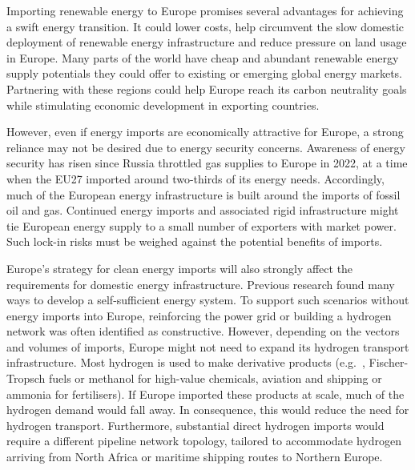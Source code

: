 
Importing renewable energy to Europe promises several advantages for achieving a
swift energy transition. It could lower costs, help circumvent the slow domestic
deployment of renewable energy infrastructure and reduce pressure on land usage
in Europe. Many parts of the world have cheap and abundant renewable energy
supply potentials they could offer to existing or emerging global energy
markets.\cite{irenaGlobalHydrogen2022,luxSupplyCurves2021,vanderzwaanTimmermansDream2021,fasihiLongTermHydrocarbon2017,reichenbergDeepDecarbonization2022,galvanExportingSunshine2022,armijoFlexibleProduction2020,pfennigGlobalGISbasedPotential2023}
Partnering with these regions could help Europe reach its carbon neutrality
goals while stimulating economic development in exporting countries.


However, even if energy imports are economically attractive for Europe, a strong
reliance may not be desired due to energy security concerns. Awareness of energy
security has risen since Russia throttled gas supplies to Europe in
2022,\cite{pedersenLongtermImplications2022} at a time when the EU27 imported
around two-thirds of its energy needs.\cite{eurostatCompleteEnergy2023}
Accordingly, much of the European energy infrastructure is built around the
imports of fossil oil and gas. Continued energy imports and associated rigid
infrastructure might tie European energy supply to a small number of exporters
with market power. Such lock-in risks must be weighed against the potential
benefits of imports.


Europe's strategy for clean energy imports will also strongly affect the
requirements for domestic energy infrastructure. Previous research found many
ways to develop a self-sufficient energy
system.\cite{pickeringDiversityOptions2022,trondleHomemadeImported2019,brownSynergiesSector2018}
To support such scenarios without energy imports into Europe, reinforcing the
power grid or building a hydrogen network was often identified as
constructive.\cite{neumannPotentialRole2023,victoriaSpeedTechnological2022}
However, depending on the vectors and volumes of imports, Europe might not need
to expand its hydrogen transport infrastructure. Most hydrogen is used to make
derivative products (e.g.~, Fischer-Tropsch fuels or methanol for high-value
chemicals, aviation and shipping or ammonia for
fertilisers).\cite{neumannPotentialRole2023} If Europe imported these products
at scale, much of the hydrogen demand would fall away. In consequence, this
would reduce the need for hydrogen transport. Furthermore, substantial direct
hydrogen imports would require a different pipeline network topology, tailored
to accommodate hydrogen arriving from North Africa or maritime shipping routes
to Northern Europe.

